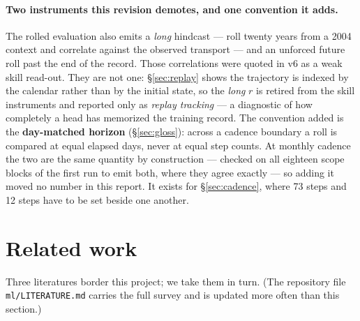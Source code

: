 \documentclass[10pt]{article}
\newcommand{\term}[1]{\textbf{#1}}
\begin{document}
\paragraph{Two instruments this revision demotes, and one convention it
adds.} The rolled evaluation also emits a \emph{long} hindcast --- roll
twenty years from a 2004 context and correlate against the observed
transport --- and an unforced future roll past the end of the record.
Those correlations were quoted in v6 as a weak skill read-out. They are
not one: \S\ref{sec:replay} shows the trajectory is indexed by the
calendar rather than by the initial state, so the \emph{long} $r$ is
retired from the skill instruments and reported only as \emph{replay
tracking} --- a diagnostic of how completely a head has memorized the
training record. The convention added is the \term{day-matched horizon}
(\S\ref{sec:gloss}): across a cadence boundary a roll is compared at equal
elapsed days, never at equal step counts. At monthly cadence the two are
the same quantity by construction --- checked on all eighteen scope blocks
of the first run to emit both, where they agree exactly --- so adding it
moved no number in this report. It exists for \S\ref{sec:cadence}, where
73 steps and 12 steps have to be set beside one another.

\section{Related work}\label{sec:related}

Three literatures border this project; we take them in turn. (The
repository file \texttt{ml/LITERATURE.md} carries the full survey and
is updated more often than this section.)
\end{document}

